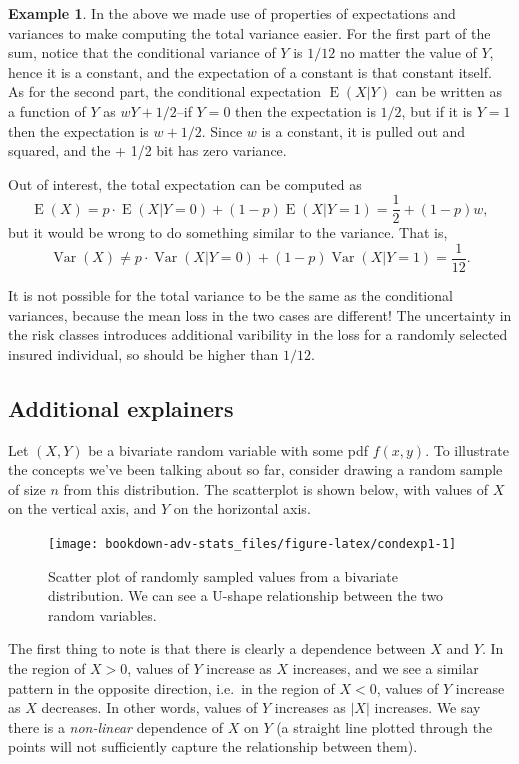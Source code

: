 \documentclass[
]{book}
\DeclareMathOperator{\E}{E}
\DeclareMathOperator{\Var}{Var}
\theoremstyle{definition}
\theoremstyle{definition}
\newtheorem{example}{Example}[chapter]
\theoremstyle{definition}
\theoremstyle{definition}
\theoremstyle{remark}
\begin{document}
\begin{example}
In the above we made use of properties of expectations and variances to make computing the total variance easier.
For the first part of the sum, notice that the conditional variance of \(Y\) is \(1/12\) no matter the value of \(Y\), hence it is a constant, and the expectation of a constant is that constant itself.
As for the second part, the conditional expectation \(\E(X|Y)\) can be written as a function of \(Y\) as \(wY + 1/2\)--if \(Y=0\) then the expectation is \(1/2\), but if it is \(Y=1\) then the expectation is \(w+1/2\).
Since \(w\) is a constant, it is pulled out and squared, and the + 1/2 bit has zero variance.

Out of interest, the total expectation can be computed as
\[
\E(X) = p\cdot \E(X|Y=0) + (1-p) \E(X|Y=1) = \frac{1}{2} + (1-p)w,
\]
but it would be wrong to do something similar to the variance.
That is,
\[
\Var(X) \neq p\cdot \Var(X|Y=0) + (1-p) \Var(X|Y=1) = \frac{1}{12}.
\]

It is not possible for the total variance to be the same as the conditional variances, because the mean loss in the two cases are different!
The uncertainty in the risk classes introduces additional varibility in the loss for a randomly selected insured individual, so should be higher than \(1/12\).
\end{example}

\hypertarget{additional-explainers}{%
\subsection{Additional explainers}\label{additional-explainers}}

Let \((X,Y)\) be a bivariate random variable with some pdf \(f(x,y)\).
To illustrate the concepts we've been talking about so far, consider drawing a random sample of size \(n\) from this distribution.
The scatterplot is shown below, with values of \(X\) on the vertical axis, and \(Y\) on the horizontal axis.

\begin{figure}

{\centering \texttt{[image: bookdown-adv-stats\_files/figure-latex/condexp1-1]} 

}

\caption{Scatter plot of randomly sampled values from a bivariate distribution. We can see a U-shape relationship between the two random variables.}\label{fig:condexp1}
\end{figure}

The first thing to note is that there is clearly a dependence between \(X\) and \(Y\).
In the region of \(X>0\), values of \(Y\) increase as \(X\) increases, and we see a similar pattern in the opposite direction, i.e.~in the region of \(X<0\), values of \(Y\) increase as \(X\) decreases.
In other words, values of \(Y\) increases as \(|X|\) increases.
We say there is a \emph{non-linear} dependence of \(X\) on \(Y\) (a straight line plotted through the points will not sufficiently capture the relationship between them).
\end{document}
